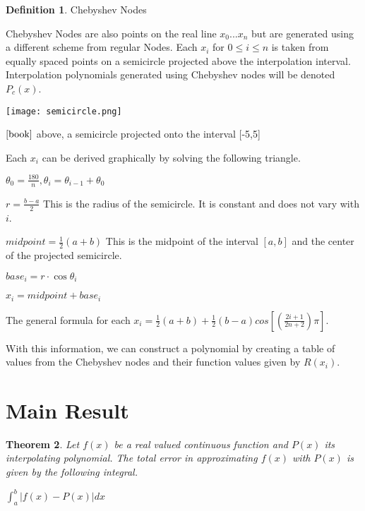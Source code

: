 \documentclass[]{article}
\theoremstyle{plain}
\newtheorem{theorem}{Theorem}[section]
\theoremstyle{definition}
\newtheorem{definition}[theorem]{Definition}
\begin{document}
\begin{definition}
Chebyshev Nodes 

Chebyshev Nodes are also points on the real line $x_0 ... x_n$ but are generated using a different scheme from regular Nodes. Each $x_i$ for $0 \leq i \leq n$ is taken from equally spaced points on a semicircle projected above the interpolation interval. Interpolation polynomials generated using Chebyshev nodes will be denoted $P_c(x)$.

\texttt{[image: semicircle.png]} 

$\cite{book}$ above, a semicircle projected onto the interval [-5,5]
\newline 

Each $x_i$ can be derived graphically by solving the following triangle. 

$\theta_0 = \frac{180}{n}, \theta_i = \theta_{i-1} + \theta_0$  

$r =  \frac{b-a}{2}$ This is the radius of the semicircle. It is constant and does not vary with $i$. 

$midpoint = \frac{1}{2}(a+b)$ This is the midpoint of the interval $[a,b]$ and the center of the projected semicircle. 

$base_i = r\cdot\cos\theta_i$

$x_i = midpoint + base_i$


The general formula for each $x_i = \frac{1}{2}(a + b) + \frac{1}{2}(b - a)cos[(\frac{2i+1}{2n+2})\pi]$.
\newline 

With this information, we can construct a polynomial by creating a table of values from the Chebyshev nodes and their function values given by $R(x_i)$. 





\end{definition}

 \section{Main Result}
 
 \begin{theorem}
Let $f(x)$ be a real valued continuous function and $P(x)$ its interpolating polynomial. The total error in approximating $f(x)$ with $P(x)$ is given by the following integral. 

\begin{center}
$\int_{a}^{b}|{f(x) - P(x)|}dx$
\end{center}


 \end{theorem}
 
\end{document}
